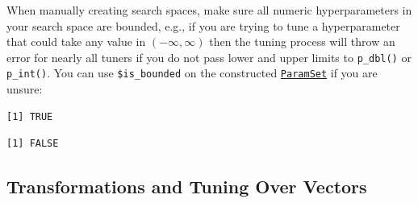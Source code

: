 \begin{tcolorbox}[enhanced jigsaw, opacitybacktitle=0.6, rightrule=.15mm, opacityback=0, arc=.35mm, breakable, titlerule=0mm, colframe=quarto-callout-warning-color-frame, coltitle=black, bottomrule=.15mm, toprule=.15mm, colback=white, colbacktitle=quarto-callout-warning-color!10!white, bottomtitle=1mm, toptitle=1mm, title=\textcolor{quarto-callout-warning-color}{\faExclamationTriangle}\hspace{0.5em}{Bounded Search Spaces}, leftrule=.75mm, left=2mm]

When manually creating search spaces, make sure all numeric
hyperparameters in your search space are bounded, e.g., if you are
trying to tune a hyperparameter that could take any value in
\((-\infty, \infty)\) then the tuning process will throw an error for
nearly all tuners if you do not pass lower and upper limits to
\texttt{p\_dbl()} or \texttt{p\_int()}. You can use
\texttt{\$is\_bounded} on the constructed
\href{https://paradox.mlr-org.com/reference/ParamSet.html}{\texttt{ParamSet}}
if you are unsure:

\begin{Shaded}
\begin{Highlighting}[]
\NormalTok{(} \NormalTok{(} \NormalTok{, } \NormalTok{))}\SpecialCharTok{$}
\end{Highlighting}
\end{Shaded}

\begin{verbatim}
[1] TRUE
\end{verbatim}

\begin{Shaded}
\begin{Highlighting}[]
\NormalTok{(} \NormalTok{(} \NormalTok{, } \NormalTok{))}\SpecialCharTok{$}
\end{Highlighting}
\end{Shaded}

\begin{verbatim}
[1] FALSE
\end{verbatim}

\end{tcolorbox}

\hypertarget{sec-tune-trafo}{%
\subsection{Transformations and Tuning Over
Vectors}\label{sec-tune-trafo}}

